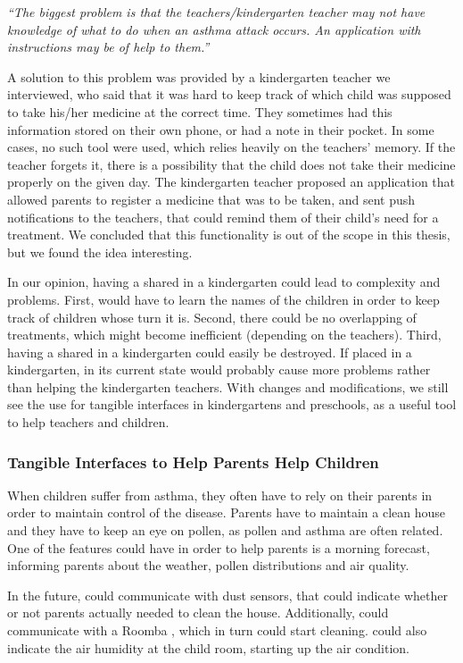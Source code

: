 \textit{``The biggest problem is that the teachers/kindergarten teacher may not have knowledge of what to do when an asthma attack occurs. An application with instructions may be of help to them.''}

A solution to this problem was provided by a kindergarten teacher we interviewed, who said that it was hard to keep track of which child was supposed to take his/her medicine at the correct time. They sometimes had this information stored on their own phone, or had a note in their pocket. In some cases, no such tool were used, which relies heavily on the teachers' memory. If the teacher forgets it, there is a possibility that the child does not take their medicine properly on the given day. 
The kindergarten teacher proposed an application that allowed parents to register a medicine that was to be taken, and sent push notifications to the teachers, that could remind them of their child's need for a treatment. We concluded that this functionality is out of the scope in this thesis, but we found the idea interesting.         

In our opinion, having a shared \buddy{} in a kindergarten could lead to complexity and problems. First, \buddy{} would have to learn the names of the children in order to keep track of children whose turn it is. Second, there could be no overlapping of treatments, which might become inefficient (depending on the teachers). Third, having a shared \buddy{} in a kindergarten could easily be destroyed. If placed in a kindergarten, \buddy{} in its current state would probably cause more problems rather than helping the kindergarten teachers. With changes and modifications, we still see the use for tangible interfaces in kindergartens and preschools, as a useful tool to help teachers and children.    


\subsubsection{Tangible Interfaces to Help Parents Help Children}
\label{sec:tuitohelpparentshelpchildren}
When children suffer from asthma, they often have to rely on their parents in order to maintain control of the disease. Parents have to maintain a clean house and they have to keep an eye on pollen, as pollen and asthma are often related. One of the features \buddy{} could have in order to help parents is a morning forecast, informing parents about the weather, pollen distributions and air quality. 

In the future, \buddy{} could communicate with dust sensors, that could indicate whether or not parents actually needed to clean the house. Additionally, \buddy{} could communicate with a Roomba , which in turn could start cleaning. \buddy{} could also indicate the air humidity at the child room, starting up the air condition.   


